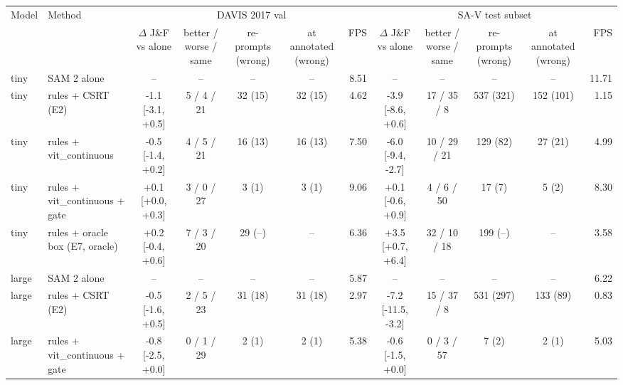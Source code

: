 \begin{tabular}{llccccrccccr}
\toprule
Model & Method & \multicolumn{5}{c}{DAVIS 2017 val} & \multicolumn{5}{c}{SA-V test subset} \\
 & & $\Delta$ J\&F vs alone & better / worse / same & re-prompts (wrong) & at annotated (wrong) & FPS & $\Delta$ J\&F vs alone & better / worse / same & re-prompts (wrong) & at annotated (wrong) & FPS \\
\midrule
tiny & SAM 2 alone & -- & -- & -- & -- & 8.51 & -- & -- & -- & -- & 11.71 \\
tiny & rules + CSRT (E2) & -1.1 [-3.1, +0.5] & 5 / 4 / 21 & 32 (15) & 32 (15) & 4.62 & -3.9 [-8.6, +0.6] & 17 / 35 / 8 & 537 (321) & 152 (101) & 1.15 \\
tiny & rules + vit\_continuous & -0.5 [-1.4, +0.2] & 4 / 5 / 21 & 16 (13) & 16 (13) & 7.50 & -6.0 [-9.4, -2.7] & 10 / 29 / 21 & 129 (82) & 27 (21) & 4.99 \\
tiny & rules + vit\_continuous + gate & +0.1 [+0.0, +0.3] & 3 / 0 / 27 & 3 (1) & 3 (1) & 9.06 & +0.1 [-0.6, +0.9] & 4 / 6 / 50 & 17 (7) & 5 (2) & 8.30 \\
tiny & rules + oracle box (E7, oracle) & +0.2 [-0.4, +0.6] & 7 / 3 / 20 & 29 (--) & -- & 6.36 & +3.5 [+0.7, +6.4] & 32 / 10 / 18 & 199 (--) & -- & 3.58 \\
large & SAM 2 alone & -- & -- & -- & -- & 5.87 & -- & -- & -- & -- & 6.22 \\
large & rules + CSRT (E2) & -0.5 [-1.6, +0.5] & 2 / 5 / 23 & 31 (18) & 31 (18) & 2.97 & -7.2 [-11.5, -3.2] & 15 / 37 / 8 & 531 (297) & 133 (89) & 0.83 \\
large & rules + vit\_continuous + gate & -0.8 [-2.5, +0.0] & 0 / 1 / 29 & 2 (1) & 2 (1) & 5.38 & -0.6 [-1.5, +0.0] & 0 / 3 / 57 & 7 (2) & 2 (1) & 5.03 \\
\bottomrule
\end{tabular}
